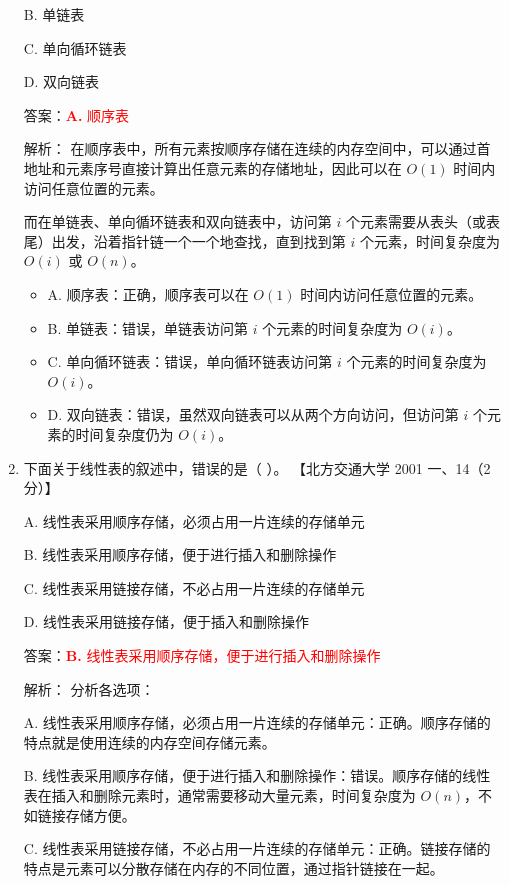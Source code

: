 \documentclass[lang=cn,newtx,10pt,scheme=chinese]{../../../elegantbook}
\begin{document}
\begin{enumerate}
        B. 单链表  
    
        C. 单向循环链表  
    
        D. 双向链表  

        答案：\textcolor{red}{\textbf{A.} 顺序表}

        解析：
        在顺序表中，所有元素按顺序存储在连续的内存空间中，可以通过首地址和元素序号直接计算出任意元素的存储地址，因此可以在 $O(1)$ 时间内访问任意位置的元素。

        而在单链表、单向循环链表和双向链表中，访问第 $i$ 个元素需要从表头（或表尾）出发，沿着指针链一个一个地查找，直到找到第 $i$ 个元素，时间复杂度为 $O(i)$ 或 $O(n)$。

        \begin{itemize}
            \item A. 顺序表：正确，顺序表可以在 $O(1)$ 时间内访问任意位置的元素。
            \item B. 单链表：错误，单链表访问第 $i$ 个元素的时间复杂度为 $O(i)$。
            \item C. 单向循环链表：错误，单向循环链表访问第 $i$ 个元素的时间复杂度为 $O(i)$。
            \item D. 双向链表：错误，虽然双向链表可以从两个方向访问，但访问第 $i$ 个元素的时间复杂度仍为 $O(i)$。
        \end{itemize}
    
        \item 下面关于线性表的叙述中，错误的是（ ）。  
        【北方交通大学 2001 一、14（2 分）】  
    
        A. 线性表采用顺序存储，必须占用一片连续的存储单元  
    
        B. 线性表采用顺序存储，便于进行插入和删除操作  
    
        C. 线性表采用链接存储，不必占用一片连续的存储单元  
    
        D. 线性表采用链接存储，便于插入和删除操作  

        答案：\textcolor{red}{\textbf{B.} 线性表采用顺序存储，便于进行插入和删除操作}

        解析：
        分析各选项：
        
        A. 线性表采用顺序存储，必须占用一片连续的存储单元：正确。顺序存储的特点就是使用连续的内存空间存储元素。
        
        B. 线性表采用顺序存储，便于进行插入和删除操作：错误。顺序存储的线性表在插入和删除元素时，通常需要移动大量元素，时间复杂度为 $O(n)$，不如链接存储方便。
        
        C. 线性表采用链接存储，不必占用一片连续的存储单元：正确。链接存储的特点是元素可以分散存储在内存的不同位置，通过指针链接在一起。
        

\end{enumerate}
\end{document}
